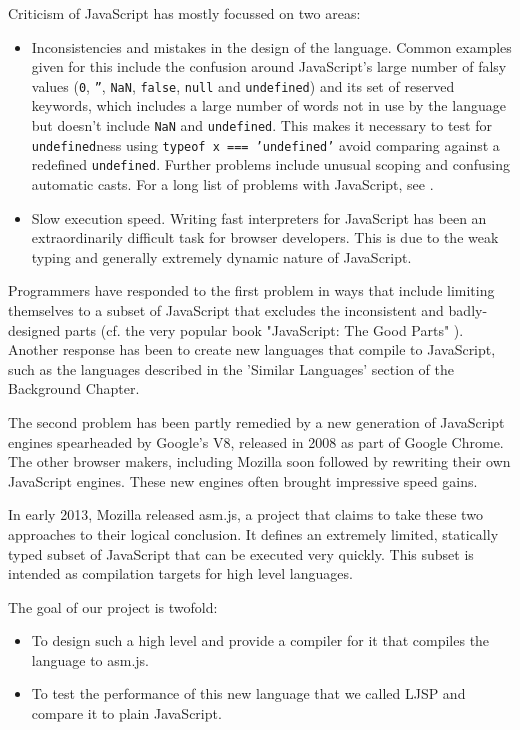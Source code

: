 \documentclass[11pt]{report}
\begin{document}
Criticism of JavaScript has mostly focussed on two areas:
\begin{itemize}
\item Inconsistencies and mistakes in the design of the language. Common examples given for this include the confusion around JavaScript's large number of falsy values (\texttt{0},  \texttt{''}, \texttt{NaN}, \texttt{false}, \texttt{null} and \texttt{undefined}) and its set of reserved keywords, which includes a large number of words not in use by the language but doesn't include \texttt{NaN} and \texttt{undefined}. This makes it necessary to test for \texttt{undefined}ness using \mbox{\texttt{typeof x === 'undefined'}} avoid comparing against a redefined \texttt{undefined}. Further problems include unusual scoping and confusing automatic casts. For a long list of problems with JavaScript, see \cite{jsgoodparts}.
\item Slow execution speed. Writing fast interpreters for JavaScript has been an extraordinarily difficult task for browser developers. This is due to the weak typing and generally extremely dynamic nature of JavaScript.
\end{itemize}

Programmers have responded to the first problem in ways that include limiting themselves to a subset of JavaScript that excludes the inconsistent and badly-designed parts (cf. the very popular book "JavaScript: The Good Parts" \cite{jsgoodparts}). Another response has been to create new languages that compile to JavaScript, such as the languages described in the 'Similar Languages' section of the Background Chapter.

The second problem has been partly remedied by a new generation of JavaScript engines spearheaded by Google's V8, released in 2008 as part of Google Chrome. The other browser makers, including Mozilla soon followed by rewriting their own JavaScript engines. These new engines often brought impressive speed gains.

In early 2013, Mozilla released asm.js, a project that claims to take these two approaches to their logical conclusion. It defines an extremely limited, statically typed subset of JavaScript that can be executed very quickly. This subset is intended as compilation targets for high level languages.

The goal of our project is twofold:
\begin{itemize}
\item To design such a high level and provide a compiler for it that compiles the language to asm.js.
\item To test the performance of this new language that we called LJSP and compare it to plain JavaScript.
\end{itemize}
\end{document}
